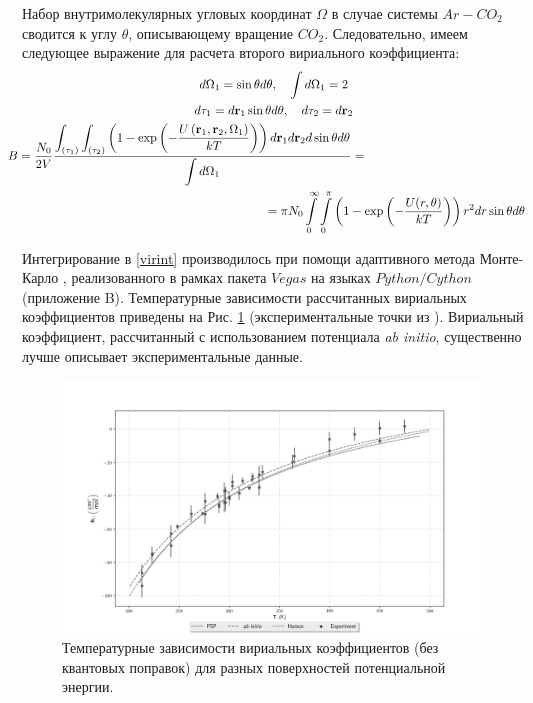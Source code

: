 Набор внутримолекулярных угловых координат $\Omega$ в случае системы $Ar-CO_2$ сводится к углу $\theta$, описывающему вращение $CO_2$. Следовательно, имеем следующее выражение для расчета второго вириального коэффициента:
\vverh
\begin{gather}
	d \Omega_1 = \sin \theta d \theta, \quad \int d \Omega_1 = 2 \notag \\
	d \tau_1 = d \mathbf{r}_1 \sin \theta d \theta, \quad d \tau_2 = d \mathbf{r}_2 \notag \\
	\hspace*{-5cm} B = \frac{N_0}{2 V} \ddfrac{\int_{\lb \tau_1 \rb} \int_{\lb \tau_2 \rb} \lb 1 - \exp \lb -\frac{U \lb \mathbf{r}_1, \mathbf{r}_2, \Omega_1 \rb}{k T} \rb \rb d \mathbf{r}_1 d \mathbf{r}_2 d \sin \theta d \theta}{\int d \Omega_1} = \notag \\ \hspace{7cm} = \pi N_0 \int\limits_{0}^{\infty} \int\limits_{0}^{\pi} \lb 1 - \exp \lb - \frac{U(r, \theta)}{k T} \rb \rb r^2 d r \sin \theta d \theta \label{virint}
\end{gather}

Интегрирование в \eqref{virint} производилось при помощи адаптивного метода Монте-Карло \cite{lepage1978}, реализованного в рамках пакета $Vegas$ 
на языках $Python/Cython$ \cite{vegas} (приложение B). Температурные зависимости рассчитанных вириальных коэффициентов приведены на Рис. \ref{fig:vir} (экспериментальные точки из \cite{dymond}). Вириальный коэффициент, рассчитанный с использованием потенциала \textit{ab initio}, существенно лучше описывает экспериментальные данные. 

\begin{figure}[!ht]
\includegraphics[width=\linewidth]{pictures/virexp.png}
\caption{\centering Температурные зависимости вириальных коэффициентов (без квантовых поправок) для разных поверхностей потенциальной энергии. }
\label{fig:vir}
\end{figure}

